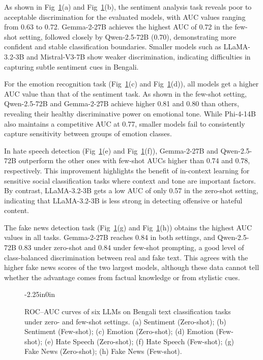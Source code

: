 \documentclass[10pt,letterpaper]{article}
\begin{document}
As shown in Fig~\ref{fig:roc_auc_analysis}(a) and Fig~\ref{fig:roc_auc_analysis}(b), the sentiment analysis task reveals poor to acceptable discrimination for the evaluated models, with AUC values ranging from 0.63 to 0.72. Gemma-2-27B achieves the highest AUC of 0.72 in the few-shot setting, followed closely by Qwen-2.5-72B (0.70), demonstrating more confident and stable classification boundaries. Smaller models such as LLaMA-3.2-3B and Mistral-V3-7B show weaker discrimination, indicating difficulties in capturing subtle sentiment cues in Bengali.

For the emotion recognition task (Fig~\ref{fig:roc_auc_analysis}(c) and Fig~\ref{fig:roc_auc_analysis}(d)), all models get a higher AUC value than that of the sentiment task. As shown in the few-shot setting, Qwen-2.5-72B and Gemma-2-27B achieve higher 0.81 and 0.80 than others, revealing their healthy discriminative power on emotional tone. While Phi-4-14B also maintains a competitive AUC at 0.77, smaller models fail to consistently capture sensitivity between groups of emotion classes.

In hate speech detection (Fig~\ref{fig:roc_auc_analysis}(e) and Fig~\ref{fig:roc_auc_analysis}(f)), Gemma-2-27B and Qwen-2.5-72B outperform the other ones with few-shot AUCs higher than 0.74 and 0.78, respectively. This improvement highlights the benefit of in-context learning for sensitive social classification tasks where context and tone are important factors. By contrast, LLaMA-3.2-3B gets a low AUC of only 0.57 in the zero-shot setting, indicating that LLaMA-3.2-3B is less strong in detecting offensive or hateful content.

The fake news detection task (Fig~\ref{fig:roc_auc_analysis}(g) and Fig~\ref{fig:roc_auc_analysis}(h)) obtains the highest AUC values in all tasks. Gemma-2-27B reaches 0.84 in both settings, and Qwen-2.5-72B 0.83 under zero-shot and 0.84 under few-shot prompting, a good level of class-balanced discrimination between real and fake text. This agrees with the higher fake news scores of the two largest models, although these data cannot tell whether the advantage comes from factual knowledge or from stylistic cues.

\begin{figure}[!t]
\begin{adjustwidth}{-2.25in}{0in}
    \centering
    \caption{ROC--AUC curves of six LLMs on Bengali text classification tasks under zero- and few-shot settings. (a) Sentiment (Zero-shot); (b) Sentiment (Few-shot); (c) Emotion (Zero-shot); (d) Emotion (Few-shot); (e) Hate Speech (Zero-shot); (f) Hate Speech (Few-shot); (g) Fake News (Zero-shot); (h) Fake News (Few-shot).}
    \label{fig:roc_auc_analysis}
\end{adjustwidth}
\end{figure}
\end{document}
